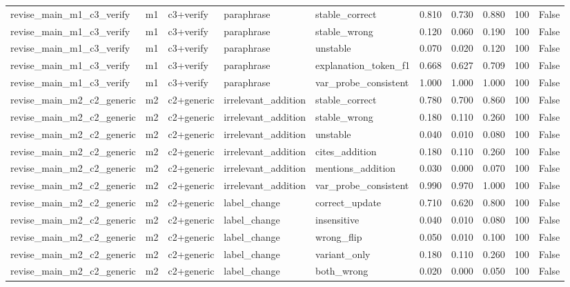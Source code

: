 \begin{tabular}{llllllllll}
revise\_main\_m1\_c3\_verify & m1 & c3+verify & paraphrase & stable\_correct & 0.810 & 0.730 & 0.880 & 100 & False \\
revise\_main\_m1\_c3\_verify & m1 & c3+verify & paraphrase & stable\_wrong & 0.120 & 0.060 & 0.190 & 100 & False \\
revise\_main\_m1\_c3\_verify & m1 & c3+verify & paraphrase & unstable & 0.070 & 0.020 & 0.120 & 100 & False \\
revise\_main\_m1\_c3\_verify & m1 & c3+verify & paraphrase & explanation\_token\_f1 & 0.668 & 0.627 & 0.709 & 100 & False \\
revise\_main\_m1\_c3\_verify & m1 & c3+verify & paraphrase & var\_probe\_consistent & 1.000 & 1.000 & 1.000 & 100 & False \\
revise\_main\_m2\_c2\_generic & m2 & c2+generic & irrelevant\_addition & stable\_correct & 0.780 & 0.700 & 0.860 & 100 & False \\
revise\_main\_m2\_c2\_generic & m2 & c2+generic & irrelevant\_addition & stable\_wrong & 0.180 & 0.110 & 0.260 & 100 & False \\
revise\_main\_m2\_c2\_generic & m2 & c2+generic & irrelevant\_addition & unstable & 0.040 & 0.010 & 0.080 & 100 & False \\
revise\_main\_m2\_c2\_generic & m2 & c2+generic & irrelevant\_addition & cites\_addition & 0.180 & 0.110 & 0.260 & 100 & False \\
revise\_main\_m2\_c2\_generic & m2 & c2+generic & irrelevant\_addition & mentions\_addition & 0.030 & 0.000 & 0.070 & 100 & False \\
revise\_main\_m2\_c2\_generic & m2 & c2+generic & irrelevant\_addition & var\_probe\_consistent & 0.990 & 0.970 & 1.000 & 100 & False \\
revise\_main\_m2\_c2\_generic & m2 & c2+generic & label\_change & correct\_update & 0.710 & 0.620 & 0.800 & 100 & False \\
revise\_main\_m2\_c2\_generic & m2 & c2+generic & label\_change & insensitive & 0.040 & 0.010 & 0.080 & 100 & False \\
revise\_main\_m2\_c2\_generic & m2 & c2+generic & label\_change & wrong\_flip & 0.050 & 0.010 & 0.100 & 100 & False \\
revise\_main\_m2\_c2\_generic & m2 & c2+generic & label\_change & variant\_only & 0.180 & 0.110 & 0.260 & 100 & False \\
revise\_main\_m2\_c2\_generic & m2 & c2+generic & label\_change & both\_wrong & 0.020 & 0.000 & 0.050 & 100 & False \\

\end{tabular}
